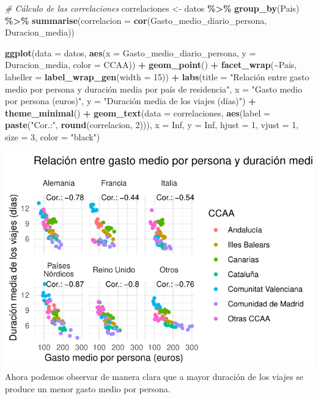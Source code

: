 \documentclass[data,article,submit,moreauthors,pdftex]{Definitions/mdpi}
\newenvironment{Shaded}{\begin{snugshade}}{\end{snugshade}}
\newcommand{\AttributeTok}[1]{\textcolor[rgb]{0.13,0.29,0.53}{#1}}
\newcommand{\CommentTok}[1]{\textcolor[rgb]{0.56,0.35,0.01}{\textit{#1}}}
\newcommand{\ConstantTok}[1]{\textcolor[rgb]{0.56,0.35,0.01}{#1}}
\newcommand{\DecValTok}[1]{\textcolor[rgb]{0.00,0.00,0.81}{#1}}
\newcommand{\FunctionTok}[1]{\textcolor[rgb]{0.13,0.29,0.53}{\textbf{#1}}}
\newcommand{\NormalTok}[1]{#1}
\newcommand{\OtherTok}[1]{\textcolor[rgb]{0.56,0.35,0.01}{#1}}
\newcommand{\SpecialCharTok}[1]{\textcolor[rgb]{0.81,0.36,0.00}{\textbf{#1}}}
\newcommand{\StringTok}[1]{\textcolor[rgb]{0.31,0.60,0.02}{#1}}
\begin{document}
\begin{Shaded}
\begin{Highlighting}[]
\CommentTok{\# Cálculo de las correlaciones}
\NormalTok{correlaciones }\OtherTok{\textless{}{-}}\NormalTok{ datos }\SpecialCharTok{\%\textgreater{}\%}
    \FunctionTok{group\_by}\NormalTok{(Pais) }\SpecialCharTok{\%\textgreater{}\%}
    \FunctionTok{summarise}\NormalTok{(}\AttributeTok{correlacion =} \FunctionTok{cor}\NormalTok{(Gasto\_medio\_diario\_persona, Duracion\_media))}


\FunctionTok{ggplot}\NormalTok{(}\AttributeTok{data =}\NormalTok{ datos, }\FunctionTok{aes}\NormalTok{(}\AttributeTok{x =}\NormalTok{ Gasto\_medio\_diario\_persona, }\AttributeTok{y =}\NormalTok{ Duracion\_media,}
    \AttributeTok{color =}\NormalTok{ CCAA)) }\SpecialCharTok{+} \FunctionTok{geom\_point}\NormalTok{() }\SpecialCharTok{+} \FunctionTok{facet\_wrap}\NormalTok{(}\SpecialCharTok{\textasciitilde{}}\NormalTok{Pais, }\AttributeTok{labeller =} \FunctionTok{label\_wrap\_gen}\NormalTok{(}\AttributeTok{width =} \DecValTok{15}\NormalTok{)) }\SpecialCharTok{+}
    \FunctionTok{labs}\NormalTok{(}\AttributeTok{title =} \StringTok{"Relación entre gasto medio por persona y duración media por país de residencia"}\NormalTok{,}
        \AttributeTok{x =} \StringTok{"Gasto medio por persona (euros)"}\NormalTok{, }\AttributeTok{y =} \StringTok{"Duración media de los viajes (días)"}\NormalTok{) }\SpecialCharTok{+}
    \FunctionTok{theme\_minimal}\NormalTok{() }\SpecialCharTok{+} \FunctionTok{geom\_text}\NormalTok{(}\AttributeTok{data =}\NormalTok{ correlaciones, }\FunctionTok{aes}\NormalTok{(}\AttributeTok{label =} \FunctionTok{paste}\NormalTok{(}\StringTok{"Cor.:"}\NormalTok{,}
    \FunctionTok{round}\NormalTok{(correlacion, }\DecValTok{2}\NormalTok{))), }\AttributeTok{x =} \ConstantTok{Inf}\NormalTok{, }\AttributeTok{y =} \ConstantTok{Inf}\NormalTok{, }\AttributeTok{hjust =} \DecValTok{1}\NormalTok{, }\AttributeTok{vjust =} \DecValTok{1}\NormalTok{,}
    \AttributeTok{size =} \DecValTok{3}\NormalTok{, }\AttributeTok{color =} \StringTok{"black"}\NormalTok{)}
\end{Highlighting}
\end{Shaded}

\includegraphics{ProyectoAED2024_Rmd_files/figure-latex/unnamed-chunk-31-1.pdf}
Ahora podemos observar de manera clara que a mayor duración de los
viajes se produce un menor gasto medio por persona.
\end{document}
